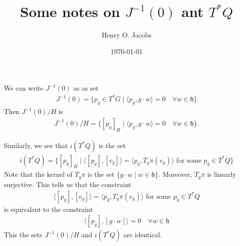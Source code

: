 \documentclass[12pt]{amsart}
\title{Some notes on $J^{-1}(0)$ ant $T^*Q$}
\author{Henry O. Jacobs}
\date{\today}
\begin{document}
\maketitle

We can write $J^{-1}(0)$ as as set
\begin{align*}
	J^{-1}(0) = \{ p_g \in T^*G \mid \langle p_g , g \cdot w \rangle = 0 \quad \forall w \in \mathfrak{h} \}
\end{align*}
Then $J^{-1}(0) / H$ is
\begin{align*}
	J^{-1}(0) / H = \{ [ p_g ]_H \mid  \langle p_g , g \cdot w \rangle = 0 \quad \forall w \in \mathfrak{h} \}.
\end{align*}

Similarly, we see that $i(T^*Q)$ is the set
\begin{align*}
	i(T^*Q) = \{ [p_g]_H \mid  \langle [p_g] , [v_g] \rangle = \langle p_q , T_g\pi(v_g) \rangle  \text{ for some } p_q \in T^*Q\}
\end{align*}
Note that the kernel of $T_g\pi$ is the set $\{ g \cdot w \mid w \in \mathfrak{h}\}$.
Moreover, $T_g \pi$ is linearly surjective.
This tells us that the constraint 
\begin{align*}
	\langle [p_g] , [v_g] \rangle = \langle p_q , T_g\pi(v_g) \rangle \text{ for some } p_q \in T^*Q
\end{align*}
is equivalent to the constraint 
\begin{align*}
	\langle [p_g], [g \cdot w] \rangle = 0 \quad \forall w \in \mathfrak{h}
\end{align*}
This the sets $J^{-1}(0) / H $ and $i(T^*Q)$ are identical.




\end{document}
